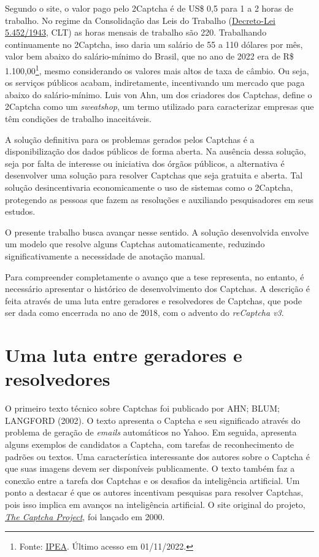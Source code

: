 \documentclass[12pt,twoside,brazilian]{book}
\begin{document}
Segundo o site, o valor pago pelo 2Captcha é de US\$ 0,5 para 1 a 2
horas de trabalho. No regime da Consolidação das Leis do Trabalho
(\href{https://www.planalto.gov.br/ccivil_03/decreto-lei/del5452.htm}{Decreto-Lei
5.452/1943}, CLT) as horas mensais de trabalho são 220. Trabalhando
continuamente no 2Captcha, isso daria um salário de 55 a 110 dólares por
mês, valor bem abaixo do salário-mínimo do Brasil, que no ano de 2022
era de R\$ 1.100,00\footnote{Fonte:
  \href{http://www.ipeadata.gov.br/exibeserie.aspx?stub=1\&serid1739471028=1739471028}{IPEA}.
  Último acesso em 01/11/2022.}, mesmo considerando os valores mais
altos de taxa de câmbio. Ou seja, os serviços públicos acabam,
indiretamente, incentivando um mercado que paga abaixo do
salário-mínimo. Luis von Ahn, um dos criadores dos Captchas, define o
2Captcha como um \emph{sweatshop}, um termo utilizado para caracterizar
empresas que têm condições de trabalho inaceitáveis.

A solução definitiva para os problemas gerados pelos Captchas é a
disponibilização dos dados públicos de forma aberta. Na ausência dessa
solução, seja por falta de interesse ou iniciativa dos órgãos públicos,
a alternativa é desenvolver uma solução para resolver Captchas que seja
gratuita e aberta. Tal solução desincentivaria economicamente o uso de
sistemas como o 2Captcha, protegendo as pessoas que fazem as resoluções
e auxiliando pesquisadores em seus estudos.

O presente trabalho busca avançar nesse sentido. A solução desenvolvida
envolve um modelo que resolve alguns Captchas automaticamente, reduzindo
significativamente a necessidade de anotação manual.

Para compreender completamente o avanço que a tese representa, no
entanto, é necessário apresentar o histórico de desenvolvimento dos
Captchas. A descrição é feita através de uma luta entre geradores e
resolvedores de Captchas, que pode ser dada como encerrada no ano de
2018, com o advento do \emph{reCaptcha v3}.

\hypertarget{sec-historia}{%
\section{Uma luta entre geradores e resolvedores}\label{sec-historia}}

O primeiro texto técnico sobre Captchas foi publicado por AHN; BLUM;
LANGFORD (2002). O texto apresenta o Captcha e seu significado através
do problema de geração de \emph{emails} automáticos no Yahoo. Em
seguida, apresenta alguns exemplos de candidatos a Captcha, com tarefas
de reconhecimento de padrões ou textos. Uma característica interessante
dos autores sobre o Captcha é que suas imagens devem ser disponíveis
publicamente. O texto também faz a conexão entre a tarefa dos Captchas e
os desafios da inteligência artificial. Um ponto a destacar é que os
autores incentivam pesquisas para resolver Captchas, pois isso implica
em avanços na inteligência artificial. O site original do projeto,
\href{https://web.archive.org/web/20010723114217/http://www.captcha.net/}{\emph{The
Captcha Project}}, foi lançado em 2000.
\end{document}
